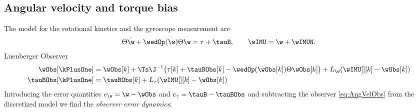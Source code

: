 \subsection{Angular velocity and torque bias}
The model for the rotational kinetics and the gyroscope measurement are
\begin{align}
 \Theta \dot{\w} + \wedOp(\w) \Theta \w = \tau + \tauB,
\qquad
 \wIMU = \w + \wIMUN.
\end{align}
Luenberger Observer
\begin{subequations}\label{eq:AngVelObs}
\begin{align}
 \wObs[\kPlusOne] &= \wObs[k] + \Ts \J^{-1} \big( \tau[k] + \tauBObs[k] - \wedOp(\wObs[k]) \Theta \wObs[k] \big) + L_{\w} (\wIMU[][k] - \wObs[k])
\\
 \tauBObs[\kPlusOne] &= \tauBObs[k] + L_\tau (\wIMU[][k] - \wObs[k])
\end{align}
\end{subequations}
Introducing the error quantities $e_{\w} = \w - \wObs$ and $e_\tau = \tauB - \tauBObs$ and subtracting the observer \eqref{eq:AngVelObs} from the discretized model we find the \textit{observer error dynamics}:
